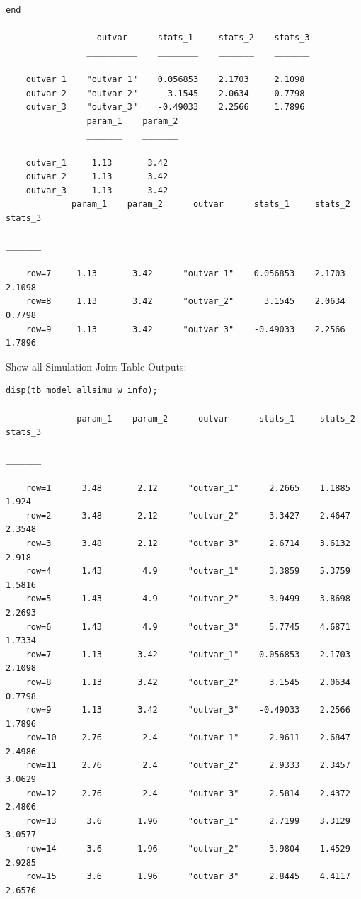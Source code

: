 \documentclass[
]{book}
\begin{document}
\begin{verbatim}
end

                  outvar      stats_1     stats_2    stats_3
                __________    ________    _______    _______

    outvar_1    "outvar_1"    0.056853    2.1703     2.1098 
    outvar_2    "outvar_2"      3.1545    2.0634     0.7798 
    outvar_3    "outvar_3"    -0.49033    2.2566     1.7896 
                param_1    param_2
                _______    _______

    outvar_1     1.13       3.42  
    outvar_2     1.13       3.42  
    outvar_3     1.13       3.42  
             param_1    param_2      outvar      stats_1     stats_2    stats_3
             _______    _______    __________    ________    _______    _______

    row=7     1.13       3.42      "outvar_1"    0.056853    2.1703     2.1098 
    row=8     1.13       3.42      "outvar_2"      3.1545    2.0634     0.7798 
    row=9     1.13       3.42      "outvar_3"    -0.49033    2.2566     1.7896 
\end{verbatim}

Show all Simulation Joint Table Outputs:

\begin{verbatim}
disp(tb_model_allsimu_w_info);

              param_1    param_2      outvar      stats_1     stats_2    stats_3
              _______    _______    __________    ________    _______    _______

    row=1      3.48       2.12      "outvar_1"      2.2665    1.1885      1.924 
    row=2      3.48       2.12      "outvar_2"      3.3427    2.4647     2.3548 
    row=3      3.48       2.12      "outvar_3"      2.6714    3.6132      2.918 
    row=4      1.43        4.9      "outvar_1"      3.3859    5.3759     1.5816 
    row=5      1.43        4.9      "outvar_2"      3.9499    3.8698     2.2693 
    row=6      1.43        4.9      "outvar_3"      5.7745    4.6871     1.7334 
    row=7      1.13       3.42      "outvar_1"    0.056853    2.1703     2.1098 
    row=8      1.13       3.42      "outvar_2"      3.1545    2.0634     0.7798 
    row=9      1.13       3.42      "outvar_3"    -0.49033    2.2566     1.7896 
    row=10     2.76        2.4      "outvar_1"      2.9611    2.6847     2.4986 
    row=11     2.76        2.4      "outvar_2"      2.9333    2.3457     3.0629 
    row=12     2.76        2.4      "outvar_3"      2.5814    2.4372     2.4806 
    row=13      3.6       1.96      "outvar_1"      2.7199    3.3129     3.0577 
    row=14      3.6       1.96      "outvar_2"      3.9804    1.4529     2.9285 
    row=15      3.6       1.96      "outvar_3"      2.8445    4.4117     2.6576
\end{verbatim}
\end{document}
